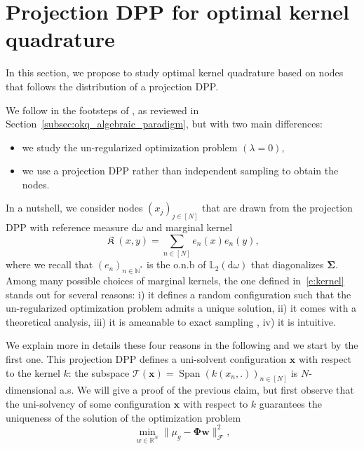 \documentclass[twoside,11pt]{book}
\DeclareMathOperator{\Span}{\mathrm{Span}}
\DeclareMathOperator*{\KDPP}{\mathfrak{K}}
\begin{document}
\section{Projection DPP for optimal kernel quadrature}
In this section, we propose to study optimal kernel quadrature based on nodes that follows the distribution of a projection DPP.



We follow in the footsteps of \cite{Bac17}, as reviewed in Section~\ref{subsec:okq_algebraic_paradigm}, but with two main differences:
\begin{itemize}
\item we study the un-regularized optimization problem $(\lambda = 0)$,
\item we use a projection DPP rather than independent sampling to obtain the nodes.
\end{itemize}

In a nutshell, we consider nodes $(x_{j})_{j \in [N]}$ that are drawn from the projection DPP with reference measure $\mathrm{d}\omega$ and marginal kernel
\begin{equation}
  \KDPP(x,y) = \sum\limits_{n \in [N]} e_{n}(x)e_{n}(y),
  \label{e:kernel}
\end{equation}
where we recall that $(e_{n})_{n \in \mathbb{N}^{*}}$ is the o.n.b of $\mathbb{L}_{2}(\mathrm{d}\omega)$ that diagonalizes $\bm{\Sigma}$. Among many possible choices of marginal kernels, the one defined in~\eqref{e:kernel} stands out for several reasons: i)
it defines a random configuration such that the un-regularized optimization problem admits a unique solution, ii) it comes with a theoretical analysis, iii) it is ameanable to exact sampling , iv) it is intuitive.

We explain more in details these four reasons in the following and we start by the first one. This projection DPP defines a uni-solvent configuration $\bm{x}$ with respect to the kernel $k$: the subspace $\mathcal{T}(\bm{x}) = \Span (k(x_{n},.))_{n \in [N]}$ is $N$-dimensional a.s. We will give a proof of the previous claim, but first observe that the uni-solvency of some configuration $\bm{x}$ with respect to $k$ guarantees the uniqueness of the solution of the optimization problem 
\begin{equation}\label{eq:unreg_opt_problem}
\min\limits_{w \in \mathbb{R}^{N}} \| \mu_{g} - \bm{\Phi} \bm{w} \|_{\mathcal{F}}^{2},
\end{equation}
\end{document}
